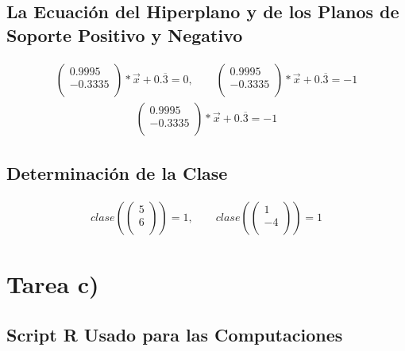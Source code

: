 \documentclass[fleqn]{llncs}
\begin{document}
\subsection{La Ecuación del Hiperplano y de los Planos de Soporte Positivo y Negativo}
\begin{align*}
	\begin{pmatrix}
		0.9995 \\
		-0.3335 \\
	\end{pmatrix} * \overrightarrow{x} + 0.\overline{3} = 0,
	\qquad
	\begin{pmatrix}
		0.9995 \\
		-0.3335 \\
	\end{pmatrix} * \overrightarrow{x} + 0.\overline{3} = -1
\end{align*}
\begin{align*}
	\begin{pmatrix}
		0.9995 \\
		-0.3335 \\
	\end{pmatrix} * \overrightarrow{x} + 0.\overline{3} = -1
\end{align*}

\subsection{Determinación de la Clase}
\begin{align*}
	clase \left(
	\begin{pmatrix}
		5 \\
		6 \\
	\end{pmatrix} \right) = 1,
	\qquad
	clase \left(
	\begin{pmatrix}
		1 \\
		-4 \\
	\end{pmatrix} \right) = 1
\end{align*}

\newpage

\section{Tarea c)}

\subsection{Script R Usado para las Computaciones}

\end{document}
